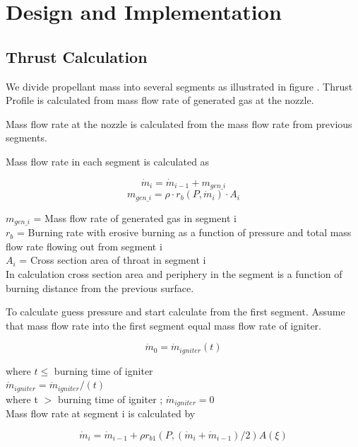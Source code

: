 \documentclass[conference]{IEEEtran}
\begin{document}
\section{Design and Implementation}

\subsection{Thrust Calculation}
We divide propellant mass into several segments as illustrated in figure . Thrust Profile is calculated from mass flow rate of generated gas at the nozzle. 

Mass flow rate at the nozzle is calculated from the mass flow rate from previous segments.

Mass flow rate in each segment is calculated as 
\begin{center}
\begin{equation}
\dot{m}_{i} = \dot{m}_{i-1}+{m}_{gen\_i}
\end{equation}
\begin{equation}
{m}_{gen\_i} = \rho\cdot{r}_b(P,\dot{m}_{i})\cdot{A}_i
\end{equation}
\end{center}
${m}_{gen\_i}$ = Mass flow rate of generated gas in segment i\\
${r}_b$ = Burning rate with erosive burning as a function of pressure and total mass flow rate flowing out from segment i\\		
${A}_i$ = Cross section area of throat in segment i\\

In calculation cross section area and periphery in the segment is a function of burning distance from the previous surface. 

To calculate guess pressure and start calculate from the first segment. Assume that mass flow rate into the first segment equal mass flow rate of igniter. 	
\begin{center}
\begin{equation}\dot{m}_{0} = \dot{m}_{igniter}(t)
\end{equation}
\end{center}
where $t \leq$ burning time of igniter\\
$\dot{m}_{igniter} = \dot{m}_{igniter}/(t)$\\
where t $>$ burning time of igniter ; $\dot{m}_{igniter}=0$\\

Mass flow rate at segment i is calculated by 
\begin{center}
\begin{equation}
\dot{m}_{i} = \dot{m}_{i-1}+\rho{r}_{b1}(P,(\dot{m}_{i}+\dot{m}_{i-1})/2)A(\xi)
\end{equation}
\end{center}
\end{document}
